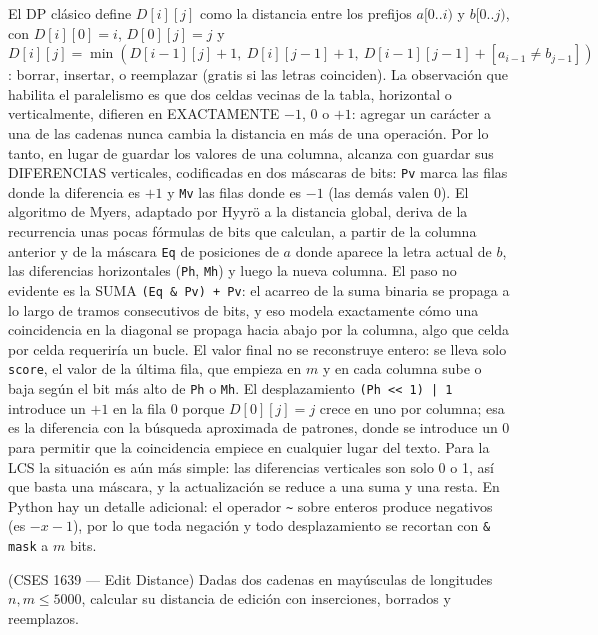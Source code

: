  El DP clásico define $D[i][j]$ como la distancia entre los prefijos $a[0..i)$ y $b[0..j)$, con $D[i][0] = i$, $D[0][j] = j$ y $D[i][j] = \min(D[i-1][j] + 1,\ D[i][j-1] + 1,\ D[i-1][j-1] + [a_{i-1} \ne b_{j-1}])$: borrar, insertar, o reemplazar (gratis si las letras coinciden). La observación que habilita el paralelismo es que dos celdas vecinas de la tabla, horizontal o verticalmente, difieren en EXACTAMENTE $-1$, $0$ o $+1$: agregar un carácter a una de las cadenas nunca cambia la distancia en más de una operación. Por lo tanto, en lugar de guardar los valores de una columna, alcanza con guardar sus DIFERENCIAS verticales, codificadas en dos máscaras de bits: \texttt{Pv} marca las filas donde la diferencia es $+1$ y \texttt{Mv} las filas donde es $-1$ (las demás valen 0). El algoritmo de Myers, adaptado por Hyyrö a la distancia global, deriva de la recurrencia unas pocas fórmulas de bits que calculan, a partir de la columna anterior y de la máscara \texttt{Eq} de posiciones de $a$ donde aparece la letra actual de $b$, las diferencias horizontales (\texttt{Ph}, \texttt{Mh}) y luego la nueva columna. El paso no evidente es la SUMA \texttt{(Eq \& Pv) + Pv}: el acarreo de la suma binaria se propaga a lo largo de tramos consecutivos de bits, y eso modela exactamente cómo una coincidencia en la diagonal se propaga hacia abajo por la columna, algo que celda por celda requeriría un bucle. El valor final no se reconstruye entero: se lleva solo \texttt{score}, el valor de la última fila, que empieza en $m$ y en cada columna sube o baja según el bit más alto de \texttt{Ph} o \texttt{Mh}. El desplazamiento \texttt{(Ph <{}< 1) | 1} introduce un $+1$ en la fila 0 porque $D[0][j] = j$ crece en uno por columna; esa es la diferencia con la búsqueda aproximada de patrones, donde se introduce un 0 para permitir que la coincidencia empiece en cualquier lugar del texto. Para la LCS la situación es aún más simple: las diferencias verticales son solo 0 o 1, así que basta una máscara, y la actualización se reduce a una suma y una resta. En Python hay un detalle adicional: el operador \texttt{\textasciitilde} sobre enteros produce negativos (es $-x-1$), por lo que toda negación y todo desplazamiento se recortan con \texttt{\& mask} a $m$ bits.~\cite{myers1999}


(CSES 1639 — Edit Distance) Dadas dos cadenas en mayúsculas de longitudes $n, m \le 5000$, calcular su distancia de edición con inserciones, borrados y reemplazos.

